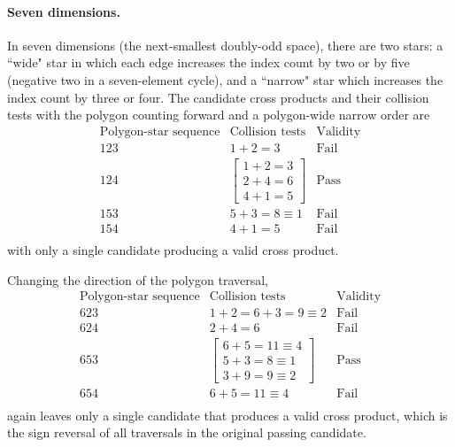 \documentclass[11pt]{article}
\begin{document}
\paragraph{Seven dimensions.} In seven dimensions (the next-smallest doubly-odd space), there are two stars: a ``wide" star in which each edge increases the index count by two or by five (negative two in a seven-element cycle), and a ``narrow" star which increases the index count by three or four. The candidate cross products and their collision tests with the polygon counting forward and a polygon-wide narrow order are
\begin{equation}
\begin{array}{c|c|c}
\text{Polygon-star sequence} & \text{Collision tests} & \text{Validity} \\\hline \hline
1 2 3 & 1+2 = 3 & \text{Fail} \\%
1 2 4 & \begin{bmatrix} 1+2=3 \\ 2+4=6 \\ 4+1 = 5 \end{bmatrix} &  \text{Pass}\\
1 5 3 & 5+3=8\equiv1 & \text{Fail} \\
1 5 4 & 4+1=5 & \text{Fail} \\
\end{array}
\end{equation}
with only a single candidate producing a valid cross product.

Changing the direction of the polygon traversal,
\begin{equation}
\begin{array}{c|c|c}
\text{Polygon-star sequence} & \text{Collision tests} & \text{Validity} \\\hline \hline
6 2 3 & 1+2 = 6+3=9\equiv2 & \text{Fail} \\%
6 2 4 & 2+4=6 & \text{Fail}\\
6 5 3 &  \begin{bmatrix} 6+5=11\equiv4 \\ 5+3=8\equiv1 \\ 3+9=9\equiv2 \end{bmatrix} &  \text{Pass} \\
6 5 4 &6+5=11\equiv4 & \text{Fail} \\
\end{array}
\end{equation}
 again leaves only a single candidate that produces a valid cross product, which is the sign reversal of all traversals in the original passing candidate.
\end{document}
